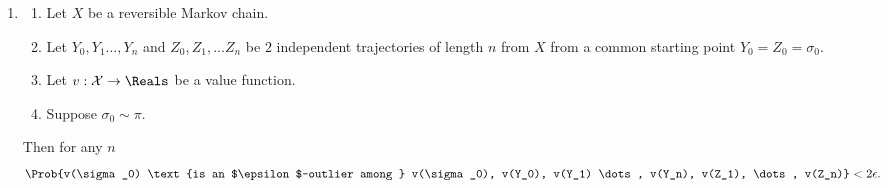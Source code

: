 \documentclass[12pt]{article}
\begin{document}
\begin{enumerate}
    \item
        \begin{theorem}
            \label{thm:parallelsignificance:twoepstest}
            \begin{enumerate}
                \item
                    Let \( X \) be a reversible Markov chain.
                \item
                    Let \( Y_0, Y_1 \dots, Y_n \) and \( Z_0, Z_1, \dots
                    Z_n \) be \( 2 \) independent trajectories of length
                    \( n \) from \( X \) from a common starting point \(
                    Y_0 = Z_0 = \sigma_0 \).
                \item
                    Let \( v :  \mathcal{X} \to \Reals \) be a value
                    function.
                \item
                    Suppose \( \sigma_0 \sim \pi \).
            \end{enumerate}
            Then for any \( n \)
            \[
                \Prob{v(\sigma_0) \text{is an $\epsilon$-outlier
                among } v(\sigma_0), v(Y_0), v(Y_1) \dots, v(Y_n), v(Z_1),
                \dots, v(Z_n)} < 2 \epsilon.
            \]


\end{theorem}
\end{enumerate}
\end{document}

